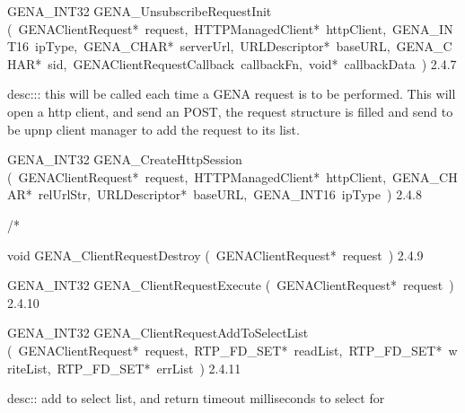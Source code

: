 \documentclass{article}
\begin{document}
\begin{cxxentry}
\begin{cxxentry}
\begin{cxxfunction}
\begin{cxxdoc}
\end{cxxdoc}
\end{cxxfunction}
\begin{cxxfunction}
{GENA\_INT32}
        {GENA\_UnsubscribeRequestInit}
        {(\ GENAClientRequest*\ request,\ HTTPManagedClient*\ httpClient,\ GENA\_INT16\ ipType,\ GENA\_CHAR*\ serverUrl,\ URLDescriptor*\ baseURL,\ GENA\_CHAR*\ sid,\ GENAClientRequestCallback\ callbackFn,\ void*\ callbackData\ )}
        {}
        {2.4.7}
\begin{cxxdoc}
desc::: this will be called each time a GENA request is to be performed. This will
open a http client, and send an POST, the request structure is filled and
send to be upnp client manager to add the request to its list.


\end{cxxdoc}
\end{cxxfunction}
\begin{cxxfunction}
{GENA\_INT32}
        {GENA\_CreateHttpSession}
        {(\ GENAClientRequest*\ request,\ HTTPManagedClient*\ httpClient,\ GENA\_CHAR*\ relUrlStr,\ URLDescriptor*\ baseURL,\ GENA\_INT16\ ipType\ )}
        {}
        {2.4.8}
\begin{cxxdoc}
/*

\end{cxxdoc}
\end{cxxfunction}
\begin{cxxfunction}
{void}
        {GENA\_ClientRequestDestroy}
        {(\ GENAClientRequest*\ request\ )}
        {}
        {2.4.9}
\end{cxxfunction}
\begin{cxxfunction}
{GENA\_INT32}
        {GENA\_ClientRequestExecute}
        {(\ GENAClientRequest*\ request\ )}
        {}
        {2.4.10}
\end{cxxfunction}
\begin{cxxfunction}
{GENA\_INT32}
        {GENA\_ClientRequestAddToSelectList}
        {(\ GENAClientRequest*\ request,\ RTP\_FD\_SET*\ readList,\ RTP\_FD\_SET*\ writeList,\ RTP\_FD\_SET*\ errList\ )}
        {}
        {2.4.11}
\begin{cxxdoc}
desc:: add to select list, and return timeout milliseconds to select for


\end{cxxdoc}
\end{cxxfunction}
\end{cxxentry}
\end{cxxentry}
\end{document}
